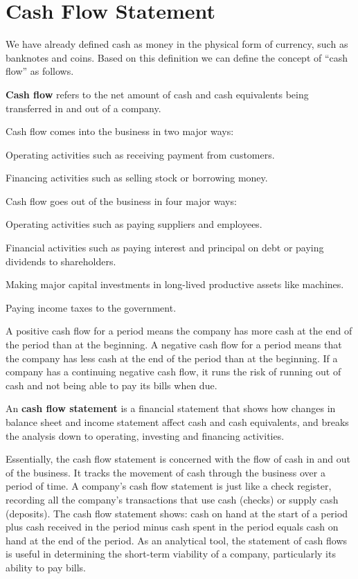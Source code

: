 \section{Cash Flow Statement}

We have already defined cash as money in the physical form of currency, such as banknotes and coins. Based on
this definition we can define the concept of ``cash flow'' as follows.

\textbf{Cash flow} refers to the net amount of cash and cash equivalents being transferred in and out of a company.
\ed

Cash flow comes into the business in two major ways:
\bit
\item Operating activities such as receiving payment from customers.
\item Financing activities such as selling stock or borrowing money.
\eit

Cash flow goes out of the business in four major ways:
\bit
\item Operating activities such as paying suppliers and employees.
\item Financial activities such as paying interest and principal on debt or paying dividends to shareholders.
\item Making major capital investments in long-lived productive assets like machines.
\item Paying income taxes to the government.
\eit

A positive cash flow for a period means the company has more cash at the end of the period than at the beginning. A
negative cash flow for a period means that the company has less cash at the end of the period than at the beginning.
If a company has a continuing negative cash flow, it runs the risk of running out of cash and not being able to pay
its bills when due.

An \textbf{cash flow statement} is a financial statement that shows how changes in balance sheet and income statement
affect cash and cash equivalents, and breaks the analysis down to operating, investing and financing activities.
\ed

Essentially, the cash flow statement is concerned with the flow of cash in and out of the business. It tracks the
movement of cash through the business over a period of time. A company's cash flow statement is just like a check
register, recording all the company's transactions that use cash (checks) or supply cash (deposits). The cash flow
statement shows: cash on hand at the start of a period plus cash received in the period minus cash spent in the
period equals cash on hand at the end of the period. As an analytical tool, the statement of cash flows is useful in
determining the short-term viability of a company, particularly its ability to pay bills.

